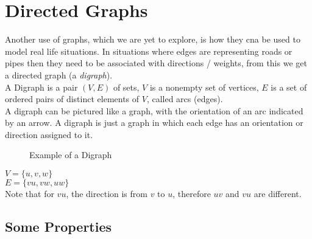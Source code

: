 
\section{Directed Graphs}
Another use of graphs, which we are yet to explore, is how they cna be used to model real life situations. In situations where edges are representing roads or pipes then they need to be associated with directions / weights, from this we get a directed graph (a \textit{digraph}). \\

A Digraph is a pair $(V, E)$ of sets, $V$ is a nonempty set of vertices, $E$ is a set of ordered pairs of distinct elements of $V$, called arcs (edges).\\

A digraph can be pictured like a graph, with the orientation of an arc indicated by an arrow. A digraph is just a graph in which each edge has an orientation or direction assigned to it.

\begin{minipage}{0.5\textwidth}
    \begin{figure}[H]
        \centering
        \caption{Example of a Digraph}
    \end{figure}
\end{minipage} \hfill
\begin{minipage}{0.45\textwidth}
$V = \{u, v, w\}$\\
$E = \{vu, vw, uw\}$\\
Note that for $vu$, the direction is from $v$ to $u$, therefore $uv$ and $vu$ are different.
\end{minipage}

\subsection{Some Properties}

